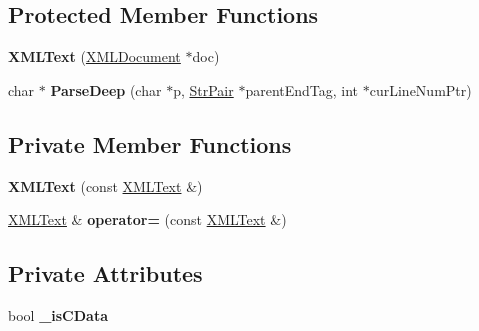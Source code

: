 \subsection*{Protected Member Functions}
\begin{DoxyCompactItemize}
\item 
{\bfseries X\+M\+L\+Text} (\hyperlink{classtinyxml2_1_1XMLDocument}{X\+M\+L\+Document} $\ast$doc)\hypertarget{classtinyxml2_1_1XMLText_ad9f46d70e61e5386ead93728d8b90267}{}\label{classtinyxml2_1_1XMLText_ad9f46d70e61e5386ead93728d8b90267}

\item 
char $\ast$ {\bfseries Parse\+Deep} (char $\ast$p, \hyperlink{classtinyxml2_1_1StrPair}{Str\+Pair} $\ast$parent\+End\+Tag, int $\ast$cur\+Line\+Num\+Ptr)\hypertarget{classtinyxml2_1_1XMLText_af3b93344f1183482e1683f5922ac9c68}{}\label{classtinyxml2_1_1XMLText_af3b93344f1183482e1683f5922ac9c68}

\end{DoxyCompactItemize}
\subsection*{Private Member Functions}
\begin{DoxyCompactItemize}
\item 
{\bfseries X\+M\+L\+Text} (const \hyperlink{classtinyxml2_1_1XMLText}{X\+M\+L\+Text} \&)\hypertarget{classtinyxml2_1_1XMLText_a002156e1f61ee6d48e5368b7cca25582}{}\label{classtinyxml2_1_1XMLText_a002156e1f61ee6d48e5368b7cca25582}

\item 
\hyperlink{classtinyxml2_1_1XMLText}{X\+M\+L\+Text} \& {\bfseries operator=} (const \hyperlink{classtinyxml2_1_1XMLText}{X\+M\+L\+Text} \&)\hypertarget{classtinyxml2_1_1XMLText_ad8c9f398d92fa472e213b89d8483ae8f}{}\label{classtinyxml2_1_1XMLText_ad8c9f398d92fa472e213b89d8483ae8f}

\end{DoxyCompactItemize}
\subsection*{Private Attributes}
\begin{DoxyCompactItemize}
\item 
bool {\bfseries \+\_\+is\+C\+Data}\hypertarget{classtinyxml2_1_1XMLText_aae1a8b4117e8c8bb107900a0560d5ab5}{}\label{classtinyxml2_1_1XMLText_aae1a8b4117e8c8bb107900a0560d5ab5}

\end{DoxyCompactItemize}
